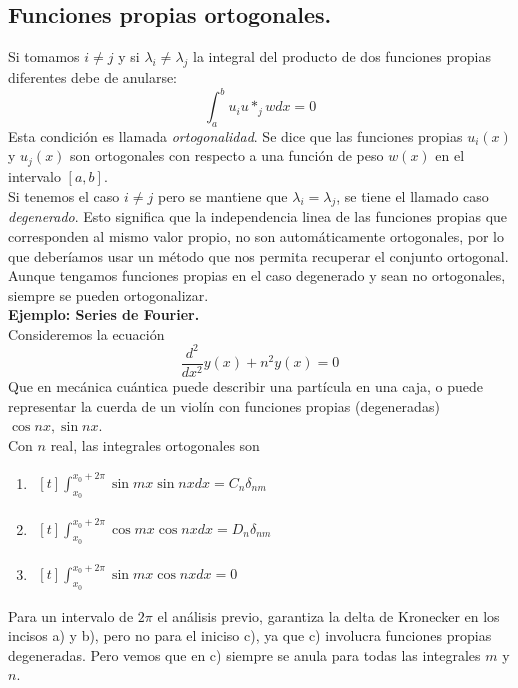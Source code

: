 \subsection{Funciones propias ortogonales.}
Si tomamos $i \neq	j$ y si $\lambda_{i} \neq \lambda_{j}$ la integral del producto de dos funciones propias diferentes debe de anularse:
\begin{equation}
\int_{a}^{b} u_{i}u*_{j} w dx = 0
\label{eq:ecuacion_35}
\end{equation}
Esta condición es llamada \emph{ortogonalidad}. Se dice que las funciones propias $u_{i}(x)$ y $u_{j}(x)$ son ortogonales con respecto a una función de peso $w(x)$ en el intervalo $[a,b]$.
\\
Si tenemos el caso $i \neq j$ pero se mantiene que $\lambda_{i} = \lambda_{j}$, se tiene el llamado caso \emph{degenerado}. Esto significa que la independencia linea de las funciones propias que corresponden al mismo valor propio, no son automáticamente ortogonales, por lo que deberíamos usar un método que nos permita recuperar el conjunto ortogonal.  Aunque tengamos funciones propias en el caso degenerado y sean no ortogonales, siempre se pueden ortogonalizar.
\\
\textbf{Ejemplo: Series de Fourier.}
\\
Consideremos la ecuación 
\[ \dfrac{d^{2}}{d x^{2}} y(x) + n^{2} y(x) = 0 \]
Que en mecánica cuántica puede describir una partícula en una caja, o puede representar la cuerda de un violín con funciones propias (degeneradas) $\cos nx, \sin nx$.
\\
Con $n$ real, las integrales ortogonales son
\begin{enumerate}[label=\alph*)]
\item $\begin{aligned}[t] \int_{x_{0}}^{x_{0} +  2 \pi} \sin mx \sin nx dx = C_{n} \delta_{nm} \end{aligned} $ 
\item $\begin{aligned}[t] \int_{x_{0}}^{x_{0} +  2 \pi} \cos mx \cos nx dx = D_{n} \delta_{nm} \end{aligned} $ 
\item $\begin{aligned}[t] \int_{x_{0}}^{x_{0} +  2 \pi} \sin mx \cos nx dx = 0 \end{aligned} $
\end{enumerate}
Para un intervalo de $2 \pi$ el análisis previo, garantiza la delta de Kronecker en los incisos a) y b), pero no para el iniciso c), ya que c) involucra funciones propias degeneradas. Pero vemos que en c) siempre se anula para todas las integrales $m$ y $n$.
